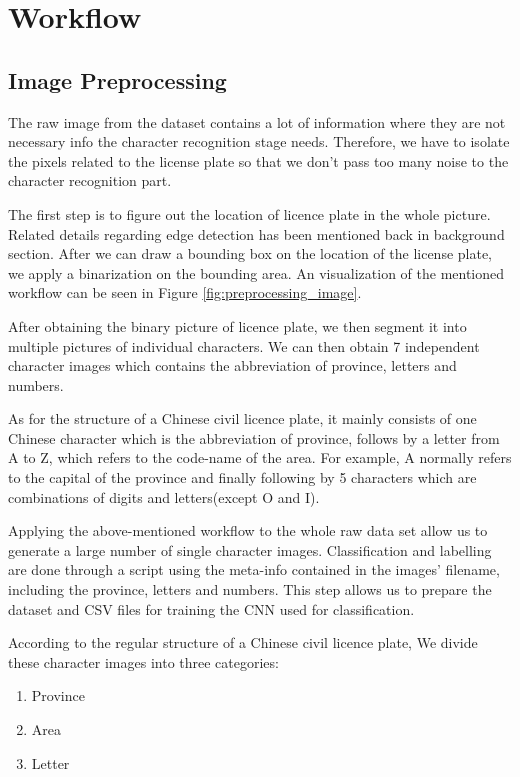 
\section{Workflow}

\subsection{Image Preprocessing}
The raw image from the dataset contains a lot of information where 
they are not necessary info the character recognition stage needs.
Therefore, we have to isolate the pixels related to the license 
plate so that we don't pass too many noise to the character recognition
part.

The first step is to figure out the location of licence plate in 
the whole picture. Related details regarding edge detection has been
mentioned back in background section. After we can draw a bounding box 
on the location of the license plate, we apply a binarization on the 
bounding area. An visualization of the mentioned workflow can be seen in 
Figure \ref{fig:preprocessing_image}. 

After obtaining the binary picture of licence plate, we then segment 
it into multiple pictures of individual characters. We can then 
obtain 7 independent character images which contains the abbreviation of 
province, letters and numbers.

As for the structure of a Chinese civil licence plate, it mainly consists 
of one Chinese character which is the abbreviation of province, follows by a 
letter from A to Z, which refers to the code-name of the area. 
For example, A normally refers to the capital of the province and 
finally following by 5 characters which are combinations of digits 
and letters(except O and I).

Applying the above-mentioned workflow to the whole raw data set allow us 
to generate a large number of single character images. Classification and
labelling are done through a script using the meta-info contained in the 
images' filename, including the province, letters and numbers. This step
allows us to prepare the dataset and CSV files for training the CNN used 
for classification.

According to the regular structure of a Chinese civil licence plate, 
We divide these character images into three categories:
\begin{enumerate}
    \item Province
    \item Area
    \item Letter
\end{enumerate}

